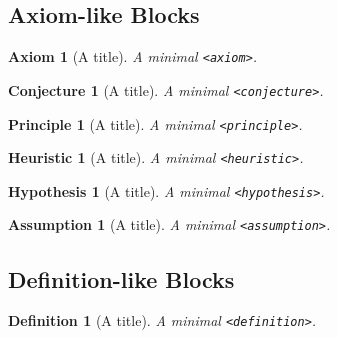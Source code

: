 \documentclass[pdflatex]{sn-jnl}
\theoremstyle{thmstyleone}%
\newtheorem{conjecture}[theorem]{Conjecture}
\theoremstyle{thmstyletwo}%
\newtheorem{definition}[theorem]{Definition}
\newtheorem{axiom}[theorem]{Axiom}
\newtheorem{principle}[theorem]{Principle}
\newtheorem{heuristic}[theorem]{Heuristic}
\newtheorem{hypothesis}[theorem]{Hypothesis}
\newtheorem{assumption}[theorem]{Assumption}
\theoremstyle{thmstylethree}%
\newcommand{\mono}[1]{\texttt{#1}}
\numberwithin{equation}{section}
\begin{document}
\subsection{Axiom-like Blocks}\label{block-samples-axiom-like}%
\begin{axiom}[A title]\label{block-samples-axiom-like-2}%
%
A minimal \mono{<axiom>}.%
\end{axiom}
\begin{conjecture}[A title]\label{block-samples-axiom-like-3}%
%
A minimal \mono{<conjecture>}.%
\end{conjecture}
\begin{principle}[A title]\label{block-samples-axiom-like-4}%
%
A minimal \mono{<principle>}.%
\end{principle}
\begin{heuristic}[A title]\label{block-samples-axiom-like-5}%
%
A minimal \mono{<heuristic>}.%
\end{heuristic}
\begin{hypothesis}[A title]\label{block-samples-axiom-like-6}%
%
A minimal \mono{<hypothesis>}.%
\end{hypothesis}
\begin{assumption}[A title]\label{block-samples-axiom-like-7}%
%
A minimal \mono{<assumption>}.%
\end{assumption}
%
%
\typeout{************************************************}
\typeout{************************************************}
%
\subsection{Definition-like Blocks}\label{block-samples-definition-like}%
\begin{definition}[A title]\label{block-samples-definition-like-2}%
%
A minimal \mono{<definition>}.%
\end{definition}
%
%
\typeout{************************************************}
\typeout{************************************************}
%
\end{document}
